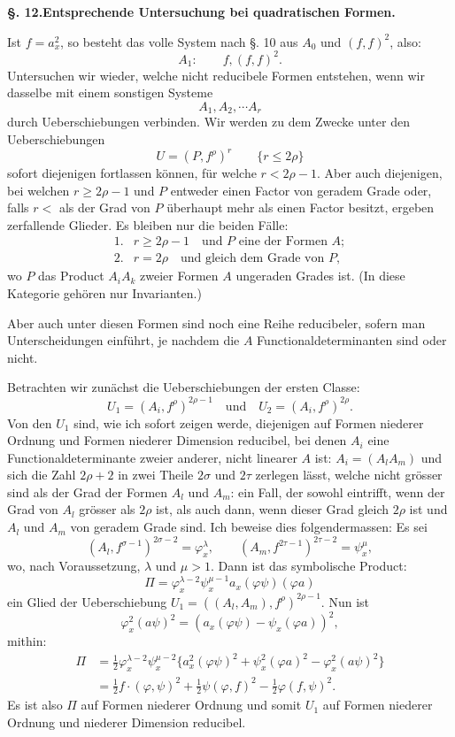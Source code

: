 \documentclass[10pt]{article}
\providecommand{\bdots}{\cdots}
\begin{document}
\begin{center}
{\bfseries §. 12.\quad Entsprechende Untersuchung bei quadratischen Formen.}
\end{center}

Ist $f=a_x^2$, so besteht das volle System nach §. 10 aus $A_0$ und $(f,f)^2$, also:
\[
A_1:
\qquad f,(f,f)^2.
\]
Untersuchen wir wieder, welche nicht reducibele Formen entstehen, wenn wir dasselbe mit einem sonstigen Systeme
\[
A_1,A_2,\bdots A_r
\]
durch Ueberschiebungen verbinden. Wir werden zu dem Zwecke unter den Ueberschiebungen
\[
U=(P,f^\rho)^r\qquad \{r\leq 2\rho\}
\]
sofort diejenigen fortlassen können, für welche $r<2\rho-1$. Aber auch diejenigen, bei welchen $r\geq 2\rho-1$ und $P$ entweder einen Factor von geradem Grade oder, falls $r<$ als der Grad von $P$ überhaupt mehr als einen Factor besitzt, ergeben zerfallende Glieder. Es bleiben nur die beiden Fälle:
\[
\begin{array}{ll}
1.& r\geq 2\rho-1\quad\text{und }P\text{ eine der Formen }A;\\
2.& r=2\rho\quad\text{und gleich dem Grade von }P,
\end{array}
\]
wo $P$ das Product $A_iA_k$ zweier Formen $A$ ungeraden Grades ist. (In diese Kategorie gehören nur Invarianten.)

Aber auch unter diesen Formen sind noch eine Reihe reducibeler, sofern man Unterscheidungen einführt, je nachdem die $A$ Functionaldeterminanten sind oder nicht.

Betrachten wir zunächst die Ueberschiebungen der ersten Classe:
\[
U_1=(A_i,f^\rho)^{2\rho-1}\quad\text{und}\quad U_2=(A_i,f^\rho)^{2\rho}.
\]
Von den $U_1$ sind, wie ich sofort zeigen werde, diejenigen auf Formen niederer Ordnung und Formen niederer Dimension reducibel, bei denen $A_i$ eine Functionaldeterminante zweier anderer, nicht linearer $A$ ist: $A_i=(A_lA_m)$ und sich die Zahl $2\rho+2$ in zwei Theile $2\sigma$ und $2\tau$ zerlegen lässt, welche nicht grösser sind als der Grad der Formen $A_l$ und $A_m$: ein Fall, der sowohl eintrifft, wenn der Grad von $A_l$ grösser als $2\rho$ ist, als auch dann, wenn dieser Grad gleich $2\rho$ ist und $A_l$ und $A_m$ von geradem Grade sind. Ich beweise dies folgendermassen: Es sei
\[
(A_l,f^{\sigma-1})^{2\sigma-2}=\varphi_x^\lambda,
\qquad
(A_m,f^{2\tau-1})^{2\tau-2}=\psi_x^\mu,
\]
wo, nach Voraussetzung, $\lambda$ und $\mu>1$. Dann ist das symbolische Product:
\[
\Pi=\varphi_x^{\lambda-2}\psi_x^{\mu-1}a_x(\varphi\psi)(\varphi a)
\]
ein Glied der Ueberschiebung $U_1=((A_l,A_m),f^\rho)^{2\rho-1}$. Nun ist
\[
\varphi_x^2(a\psi)^2=(a_x(\varphi\psi)-\psi_x(\varphi a))^2,
\]
mithin:
\[
\begin{aligned}
\Pi&=\frac12\varphi_x^{\lambda-2}\psi_x^{\mu-2}
\{a_x^2(\varphi\psi)^2+\psi_x^2(\varphi a)^2-\varphi_x^2(a\psi)^2\}\\
&=\frac12 f\cdot(\varphi,\psi)^2+\frac12\psi(\varphi,f)^2-
\frac12\varphi(f,\psi)^2.
\end{aligned}
\]
Es ist also $\Pi$ auf Formen niederer Ordnung und somit $U_1$ auf Formen niederer Ordnung und niederer Dimension reducibel.
\end{document}
